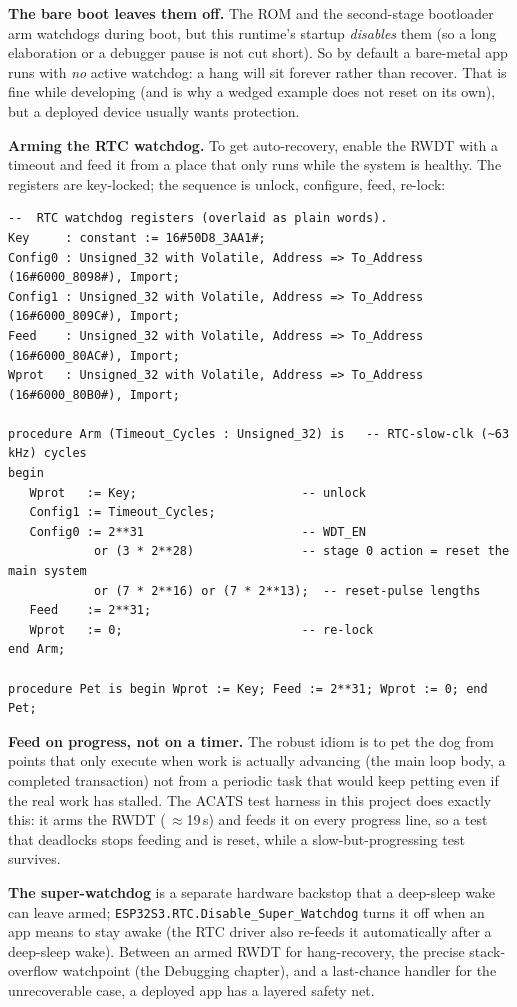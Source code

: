 \textbf{The bare boot leaves them off.} The ROM and the second-stage bootloader
arm watchdogs during boot, but this runtime's startup \emph{disables} them (so a
long elaboration or a debugger pause is not cut short). So by default a bare-metal
app runs with \emph{no} active watchdog: a hang will sit forever rather than
recover. That is fine while developing (and is why a wedged example does not
reset on its own), but a deployed device usually wants protection.

\textbf{Arming the RTC watchdog.} To get auto-recovery, enable the RWDT with a
timeout and feed it from a place that only runs while the system is healthy. The
registers are key-locked; the sequence is unlock, configure, feed, re-lock:

\begin{lstlisting}
--  RTC watchdog registers (overlaid as plain words).
Key     : constant := 16#50D8_3AA1#;
Config0 : Unsigned_32 with Volatile, Address => To_Address (16#6000_8098#), Import;
Config1 : Unsigned_32 with Volatile, Address => To_Address (16#6000_809C#), Import;
Feed    : Unsigned_32 with Volatile, Address => To_Address (16#6000_80AC#), Import;
Wprot   : Unsigned_32 with Volatile, Address => To_Address (16#6000_80B0#), Import;

procedure Arm (Timeout_Cycles : Unsigned_32) is   -- RTC-slow-clk (~63 kHz) cycles
begin
   Wprot   := Key;                       -- unlock
   Config1 := Timeout_Cycles;
   Config0 := 2**31                      -- WDT_EN
            or (3 * 2**28)               -- stage 0 action = reset the main system
            or (7 * 2**16) or (7 * 2**13);  -- reset-pulse lengths
   Feed    := 2**31;
   Wprot   := 0;                         -- re-lock
end Arm;

procedure Pet is begin Wprot := Key; Feed := 2**31; Wprot := 0; end Pet;
\end{lstlisting}

\textbf{Feed on progress, not on a timer.} The robust idiom is to pet the dog from
points that only execute when work is actually advancing (the main loop body, a
completed transaction) not from a periodic task that would keep petting even if
the real work has stalled. The ACATS test harness in this project does exactly
this: it arms the RWDT (\,$\approx$19\,s) and feeds it on every progress line, so a
test that deadlocks stops feeding and is reset, while a slow-but-progressing test
survives.

\textbf{The super-watchdog} is a separate hardware backstop that a deep-sleep wake
can leave armed; \texttt{ESP32S3.RTC.Disable\_Super\_Watchdog} turns it off when an
app means to stay awake (the RTC driver also re-feeds it automatically after a
deep-sleep wake). Between an armed RWDT for hang-recovery, the precise
stack-overflow watchpoint (the Debugging chapter), and a last-chance handler for
the unrecoverable case, a deployed app has a layered safety net.

